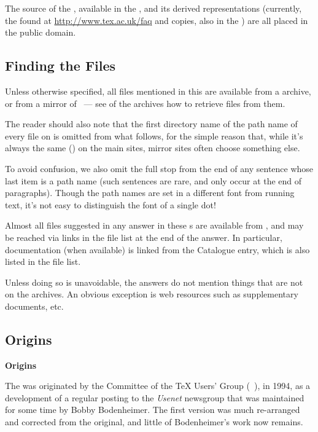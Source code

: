 \begin{introduction}
The source of the , available in the %
, and its derived
representations (currently, the  found at
\url{http://www.tex.ac.uk/faq} and  copies, also in the
) are all placed in the
public domain.

\subsection{Finding the Files}
\begin{typesetversion}
Unless otherwise specified, all files mentioned in this 
are available from a \ctan{} archive, or from a mirror of
\ctan{}~--- see %
 of the \ctan{}
archives how to retrieve files
from them.

The reader should also note that the first directory name of the path
name of every file on \ctan{} is omitted from what follows, for
the simple reason that, while it's always the same
() on the main sites, mirror sites often choose
something else.

To avoid confusion, we also omit the full stop from the end of any
sentence whose last item is a path name (such sentences are rare, and
only occur at the end of paragraphs).  Though the path names are set
in a different font from running text, it's not easy to distinguish
the font of a single dot!
\end{typesetversion}
\begin{htmlversion}
Almost all files suggested in any answer in these s are
available from , and may be
reached via links in the file list at the end of the answer.  In
particular, documentation (when available) is linked from the
\ctan{} Catalogue entry, which is also listed in the file list.

Unless doing so is unavoidable, the answers do not mention things that
are not on the \ctan{} archives.  An obvious exception is web
resources such as supplementary documents, etc.
\end{htmlversion}

\begin{typesetversion}
  \subsection*{Origins}
\end{typesetversion}
\begin{htmlversion}
  \textbf{Origins}
\end{htmlversion}
The  was originated by the Committee of the 
\TeX{} Users' Group (~), in 1994, as a development of a
regular posting to the \emph{Usenet} newsgroup
 that was maintained for some time by Bobby
Bodenheimer.  The first  version was much re-arranged and
corrected from the original, and little of Bodenheimer's work now
remains.


\end{introduction}
